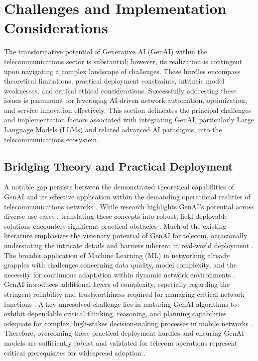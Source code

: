 \documentclass[sigconf]{acmart}
\begin{document}
\section{Challenges and Implementation Considerations}
\label{sec:challenges}

The transformative potential of Generative AI (GenAI) within the telecommunications sector is substantial; however, its realization is contingent upon navigating a complex landscape of challenges. These hurdles encompass theoretical limitations, practical deployment constraints, intrinsic model weaknesses, and critical ethical considerations. Successfully addressing these issues is paramount for leveraging AI-driven network automation, optimization, and service innovation effectively. This section delineates the principal challenges and implementation factors associated with integrating GenAI, particularly Large Language Models (LLMs) and related advanced AI paradigms, into the telecommunications ecosystem.

\subsection{Bridging Theory and Practical Deployment}
\label{sec:theory_practice_gap}

A notable gap persists between the demonstrated theoretical capabilities of GenAI and its effective application within the demanding operational realities of telecommunications networks \cite{ref2}. While research highlights GenAI's potential across diverse use cases \cite{ref2, ref9}, translating these concepts into robust, field-deployable solutions encounters significant practical obstacles \cite{ref2, ref26}. Much of the existing literature emphasizes the visionary potential of GenAI for telecom, occasionally understating the intricate details and barriers inherent in real-world deployment \cite{ref2}. The broader application of Machine Learning (ML) in networking already grapples with challenges concerning data quality, model complexity, and the necessity for continuous adaptation within dynamic network environments \cite{ref12}. GenAI introduces additional layers of complexity, especially regarding the stringent reliability and trustworthiness required for managing critical network functions \cite{ref6}. A key unresolved challenge lies in maturing GenAI algorithms to exhibit dependable critical thinking, reasoning, and planning capabilities adequate for complex, high-stakes decision-making processes in mobile networks \cite{ref6}. Therefore, overcoming these practical deployment hurdles and ensuring GenAI models are sufficiently robust and validated for telecom operations represent critical prerequisites for widespread adoption \cite{ref26}.
\end{document}
